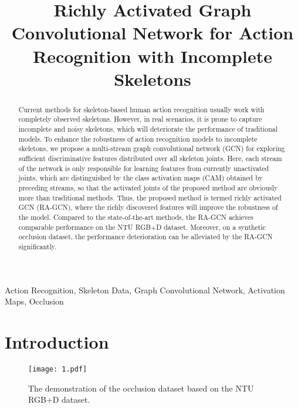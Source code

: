 \documentclass{article}
\title{Richly Activated Graph Convolutional Network for Action Recognition with Incomplete Skeletons}
\begin{document}
\maketitle

\begin{abstract}
Current methods for skeleton-based human action recognition usually work with completely observed skeletons. However, in real scenarios, it is prone to capture incomplete and noisy skeletons, which will deteriorate the performance of traditional models. To enhance the robustness of action recognition models to incomplete skeletons, we propose a multi-stream graph convolutional network (GCN) for exploring sufficient discriminative features distributed over all skeleton joints. Here, each stream of the network is only responsible for learning features from currently unactivated joints, which are distinguished by the class activation maps (CAM) obtained by preceding streams, so that the activated joints of the proposed method are obviously more than traditional methods. Thus, the proposed method is termed richly activated GCN (RA-GCN), where the richly discovered features will improve the robustness of the model. Compared to the state-of-the-art methods, the RA-GCN achieves comparable performance on the NTU RGB+D dataset. Moreover, on a synthetic occlusion dataset, the performance deterioration can be alleviated by the RA-GCN significantly.
\end{abstract}

\begin{keywords}
Action Recognition, Skeleton Data, Graph Convolutional Network, Activation Maps, Occlusion
\end{keywords}

\section{Introduction}
\label{sec:intro}

\begin{figure}[t]
\label{fig:1}
\centerline{\texttt{[image: 1.pdf]}}
\caption{The demonstration of the occlusion dataset based on the NTU RGB+D dataset.}
\vspace{-0.2cm}
\end{figure}
\end{document}
